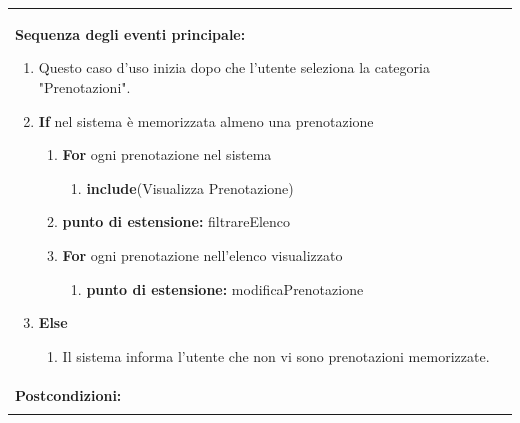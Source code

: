 \documentclass{article}
\begin{document}
\begin{table}[H]
\begin{tabular}{|p{\linewidth}|}
\begin{minipage}{\linewidth}
                        \end{minipage}
                        \vspace{0pt} \\
                        \hline
                        \textbf{Sequenza degli eventi principale:}
                        \begin{enumerate}
                            \item Questo caso d'uso inizia dopo che l'utente seleziona la categoria "Prenotazioni".
                            \item \textbf{If} nel sistema è memorizzata almeno una prenotazione
                            \begin{enumerate}
                                \item \textbf{For} ogni prenotazione nel sistema
                                \begin{enumerate}
                                    \item \textbf{include}(Visualizza Prenotazione)
                                \end{enumerate}
                                \item[] \textbf{punto di estensione:} filtrareElenco
                                \item \textbf{For} ogni prenotazione nell'elenco visualizzato
                                \begin{enumerate}
                                    \item[] \textbf{punto di estensione:} modificaPrenotazione %
                                \end{enumerate}
                            \end{enumerate}
                            \item \textbf{Else}
                            \begin{enumerate}
                                \item Il sistema informa l'utente che non vi sono prenotazioni memorizzate.
                            \end{enumerate}
                        \end{enumerate} \\
                        \hline
                        \cellcolor{gray!20}
                        \textbf{Postcondizioni:} \\
                        \cellcolor{gray!20}

\end{tabular}
\end{table}
\end{document}
